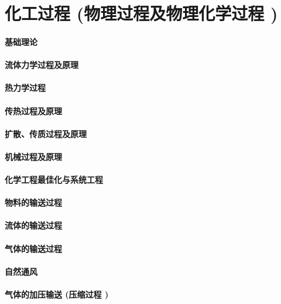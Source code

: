 \documentclass[UTF8]{../../ApplicationUniverse}
\begin{document}
\chapter{化工过程 (物理过程及物理化学过程 )}
\subsubsection{基础理论}
    \subsubsection{流体力学过程及原理}
    \subsubsection{热力学过程}
    \subsubsection{传热过程及原理}
    \subsubsection{扩散、传质过程及原理}
    \subsubsection{机械过程及原理}
    \subsubsection{化学工程最佳化与系统工程}

\subsubsection{物料的输送过程}
    \subsubsection{流体的输送过程}
        \subsubsection{气体的输送过程}
            \subsubsection{自然通风}
            \subsubsection{气体的加压输送 (压缩过程 )}
\end{document}
